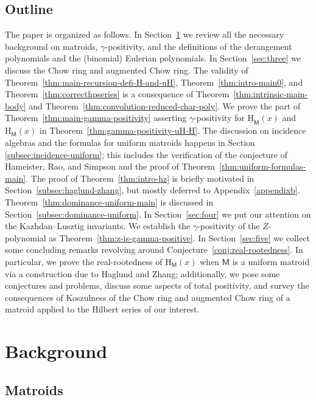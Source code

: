 \documentclass[11pt, a4paper, english]{amsart}
\theoremstyle{teoremas}
\theoremstyle{definition}
\newcommand{\M}{\mathsf{M}}
\renewcommand{\H}{\mathrm{H}}
\newcommand{\uH}{\underline{\mathrm{H}}}
\begin{document}
\subsection{Outline}

The paper is organized as follows. In Section~\ref{sec:two} we review all the necessary background on matroids, $\gamma$-positivity, and the definitions of the derangement polynomials and the (binomial) Eulerian polynomials. 
In Section~\ref{sec:three} we discuss the Chow ring and augmented Chow ring. The validity of Theorem~\ref{thm:main-recursion-defi-H-and-uH}, Theorem~\ref{thm:intro-main0}, and Theorem~\ref{thm:correcthpseries} is a consequence of Theorem~\ref{thm:intrinsic-main-body} and Theorem~\ref{thm:convolution-reduced-char-poly}.
We prove the part of Theorem~\ref{thm:main-gamma-positivity} asserting $\gamma$-positivity for $\uH_\M(x)$ and $\H_\M(x)$ in Theorem~\ref{thm:gamma-positivity-uH-H}. The discussion on incidence algebras and the formulas for uniform matroids happens in Section \ref{subsec:incidence-uniform}; this includes the verification of the conjecture of Hameister, Rao, and Simpson and the proof of Theorem~\ref{thm:uniform-formulas-main}. The proof of Theorem~\ref{thm:intro-hz} is briefly motivated in Section~\ref{subsec:haglund-zhang}, but mostly deferred to Appendix~\ref{appendixb}. Theorem~\ref{thm:dominance-uniform-main} is discussed in Section~\ref{subsec:dominance-uniform}.
In Section~\ref{sec:four} we put our attention on the Kazhdan--Lusztig invariants. We establish the $\gamma$-positivity of the $Z$-polynomial as Theorem~\ref{thm:z-is-gamma-positive}.
In Section~\ref{sec:five} we collect some concluding remarks revolving around Conjecture~\ref{conj:real-rootedness}. In particular, we prove the real-rootedness of $\H_{\M}(x)$ when $\M$ is a uniform matroid via a construction due to Haglund and Zhang; additionally, we pose some conjectures and problems, discuss some aspects of total positivity, and survey the consequences of Koszulness of the Chow ring and  augmented Chow ring of a matroid applied to the Hilbert series of our interest.

\section{Background}\label{sec:two}

\subsection{Matroids}
\end{document}
